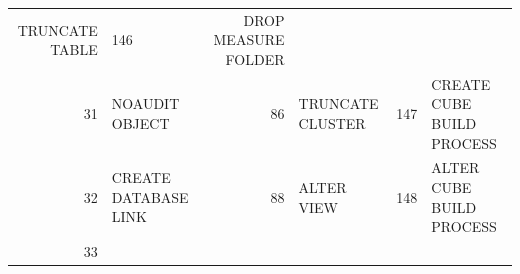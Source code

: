 \begin{appendix}
\begin{longtable}[]{@{}rl|rl|rl@{}}
\begin{minipage}[t]{0.24\columnwidth}
TRUNCATE TABLE\strut
\end{minipage} & \begin{minipage}[t]{0.06\columnwidth}\raggedright\strut
146\strut
\end{minipage} & \begin{minipage}[t]{0.24\columnwidth}\raggedright\strut
DROP MEASURE FOLDER\strut
\end{minipage}\tabularnewline
\begin{minipage}[t]{0.06\columnwidth}\raggedright\strut
31\strut
\end{minipage} & \begin{minipage}[t]{0.19\columnwidth}\raggedright\strut
NOAUDIT OBJECT\strut
\end{minipage} & \begin{minipage}[t]{0.06\columnwidth}\raggedright\strut
86\strut
\end{minipage} & \begin{minipage}[t]{0.24\columnwidth}\raggedright\strut
TRUNCATE CLUSTER\strut
\end{minipage} & \begin{minipage}[t]{0.06\columnwidth}\raggedright\strut
147\strut
\end{minipage} & \begin{minipage}[t]{0.24\columnwidth}\raggedright\strut
CREATE CUBE BUILD PROCESS\strut
\end{minipage}\tabularnewline
\begin{minipage}[t]{0.06\columnwidth}\raggedright\strut
32\strut
\end{minipage} & \begin{minipage}[t]{0.19\columnwidth}\raggedright\strut
CREATE DATABASE LINK\strut
\end{minipage} & \begin{minipage}[t]{0.06\columnwidth}\raggedright\strut
88\strut
\end{minipage} & \begin{minipage}[t]{0.24\columnwidth}\raggedright\strut
ALTER VIEW\strut
\end{minipage} & \begin{minipage}[t]{0.06\columnwidth}\raggedright\strut
148\strut
\end{minipage} & \begin{minipage}[t]{0.24\columnwidth}\raggedright\strut
ALTER CUBE BUILD PROCESS\strut
\end{minipage}\tabularnewline
\begin{minipage}[t]{0.06\columnwidth}\raggedright\strut
33\strut

\end{minipage}
\end{longtable}
\end{appendix}
